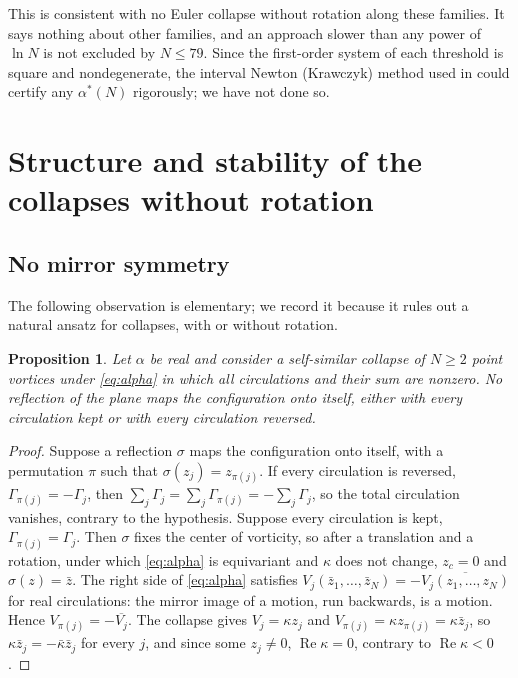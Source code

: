 \documentclass[11pt]{article}
\newtheorem{proposition}{Proposition}
\theoremstyle{definition}
\newcommand{\re}{\operatorname{Re}}
\begin{document}
This is consistent with no Euler collapse without rotation along these families. It says nothing about other families, and an approach slower than any power of $\ln N$ is not excluded by $N \le 79$. Since the first-order system of each threshold is square and nondegenerate, the interval Newton (Krawczyk) method used in \cite[Sect.~8]{mw2026} could certify any $\alpha^*(N)$ rigorously; we have not done so.

\section{Structure and stability of the collapses without rotation}\label{sec:structure}

\subsection{No mirror symmetry}

The following observation is elementary; we record it because it rules out a natural ansatz for collapses, with or without rotation.

\begin{proposition}\label{prop:mirror}
Let $\alpha$ be real and consider a self-similar collapse of $N \ge 2$ point vortices under \eqref{eq:alpha} in which all circulations and their sum are nonzero. No reflection of the plane maps the configuration onto itself, either with every circulation kept or with every circulation reversed.
\end{proposition}

\begin{proof}
Suppose a reflection $\sigma$ maps the configuration onto itself, with a permutation $\pi$ such that $\sigma(z_j) = z_{\pi(j)}$. If every circulation is reversed, $\Gamma_{\pi(j)} = -\Gamma_j$, then $\sum_j\Gamma_j = \sum_j\Gamma_{\pi(j)} = -\sum_j\Gamma_j$, so the total circulation vanishes, contrary to the hypothesis. Suppose every circulation is kept, $\Gamma_{\pi(j)} = \Gamma_j$. Then $\sigma$ fixes the center of vorticity, so after a translation and a rotation, under which \eqref{eq:alpha} is equivariant and $\kappa$ does not change, $z_c = 0$ and $\sigma(z) = \bar z$. The right side of \eqref{eq:alpha} satisfies $V_j(\bar z_1, \ldots, \bar z_N) = -\overline{V_j(z_1, \ldots, z_N)}$ for real circulations: the mirror image of a motion, run backwards, is a motion. Hence $V_{\pi(j)} = -\overline{V_j}$. The collapse gives $V_j = \kappa z_j$ and $V_{\pi(j)} = \kappa z_{\pi(j)} = \kappa\bar z_j$, so $\kappa\bar z_j = -\bar\kappa\bar z_j$ for every $j$, and since some $z_j \ne 0$, $\re\kappa = 0$, contrary to $\re\kappa < 0$.
\end{proof}
\end{document}
